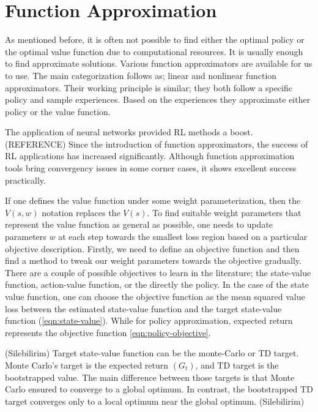 \section{Function Approximation}
As mentioned before, it is often not possible to find either the optimal policy or the optimal value function due to computational resources. It is usually enough to find approximate solutions. Various function approximators are available for us to use. The main categorization follows as; linear and nonlinear function approximators. Their working principle is similar; they both follow a specific policy and sample experiences. Based on the experiences they approximate either policy or the value function. 

The application of neural networks provided RL methods a boost.(REFERENCE) Since the introduction of function approximators, the success of RL applications has increased significantly. Although function approximation tools bring convergency issues in some corner cases, it shows excellent success practically. 

If one defines the value function under some weight parameterization, then the \(V(s, w)\) notation replaces the \(V(s)\). To find suitable weight parameters that represent the value function as general as possible, one needs to update parameters \(w\) at each step towards the smallest loss region based on a particular objective description. Firstly, we need to define an objective function and then find a method to tweak our weight parameters towards the objective gradually. 
There are a couple of possible objectives to learn in the literature; the state-value function, action-value function, or the directly the policy.
In the case of the state value function, one can choose the objective function as the mean squared value loss between the estimated state-value function and the target state-value function (\ref{eqn:state-value}). While for policy approximation, expected return represents the objective function \ref{eqn:policy-objective}. 

(Silebilirim)
Target state-value function can be the monte-Carlo or TD target. Monte Carlo’s target is the expected return \((G_t)\), and TD target is the bootstrapped value. The main difference between those targets is that Monte Carlo ensured to converge to a global optimum. In contrast, the bootstrapped TD target converges only to a local optimum near the global optimum. 
(Silebilirim)

